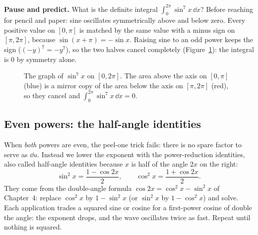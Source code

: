 \begin{recoverybox}
\textbf{Pause and predict.} What is the definite integral $\int_0^{2\pi} \sin^7 x\,\dd x$?
Before reaching for pencil and paper: sine oscillates symmetrically above and below
zero. Every positive value on $[0, \pi]$ is matched by the same value with a
minus sign on $[\pi, 2\pi]$, because $\sin(x+\pi) = -\sin x$. Raising sine to an
odd power keeps the sign ($(-y)^7 = -y^7$), so the two halves cancel completely
(Figure~\ref{ch24:fig-sin7}): the integral is $0$ by symmetry alone.
\end{recoverybox}

\begin{figure}[htbp]
\centering
{}
\caption{The graph of $\sin^7 x$ on $[0,2\pi]$. The area above the axis on
$[0,\pi]$ (blue) is a mirror copy of the area below the axis on $[\pi,2\pi]$
(red), so they cancel and $\int_0^{2\pi}\sin^7 x\,\dd x = 0$.}
\label{ch24:fig-sin7}
\end{figure}

\subsection{Even powers: the half-angle identities}

When \emph{both} powers are even, the peel-one trick fails: there is no spare
factor to serve as $\dd u$. Instead we lower the exponent with the
power-reduction identities, also called half-angle identities because $x$ is
half of the angle $2x$ on the right:
\[
\sin^2 x = \frac{1 - \cos 2x}{2},
\qquad
\cos^2 x = \frac{1 + \cos 2x}{2}.
\]
They come from the double-angle formula $\cos 2x = \cos^2 x - \sin^2 x$ of
Chapter~4: replace $\cos^2 x$ by $1 - \sin^2 x$ (or $\sin^2 x$ by
$1-\cos^2 x$) and solve. Each application trades a squared sine or cosine for a
first-power cosine of double the angle: the exponent drops, and the wave
oscillates twice as fast. Repeat until nothing is squared.

